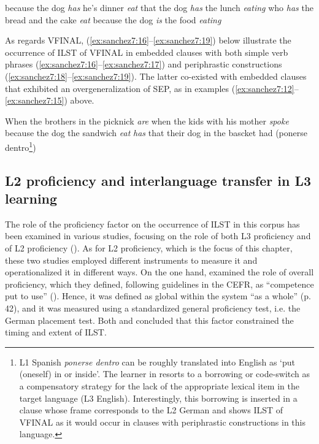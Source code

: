 \documentclass[output=paper,modfonts,nonflat, newtxmath]{langsci/langscibook}
\begin{document}
\ea%
  \label{ex:sanchez7:12}
  because the dog  \textit{has} he’s dinner {\textit{eat}}
\ex %
  \label{ex:sanchez7:13}
  that the dog \textit{has} the lunch {\textit{eating}}
\ex%
  \label{ex:sanchez7:14}
  who  \textit{has} the bread and the cake { \textit{eat}}
\ex%
  \label{ex:sanchez7:15}
  because the dog  \textit{is} the food { \textit{eating}}
\z

As regards VFINAL, (\ref{ex:sanchez7:16}--\ref{ex:sanchez7:19}) below illustrate the occurrence of ILST of VFINAL in embedded clauses with both simple verb phrases (\ref{ex:sanchez7:16}--\ref{ex:sanchez7:17}) and periphrastic constructions (\ref{ex:sanchez7:18}--\ref{ex:sanchez7:19}). The latter co-existed with embedded clauses that exhibited an overgeneralization of SEP, as in examples (\ref{ex:sanchez7:12}--\ref{ex:sanchez7:15}) above.

\ea%
  \label{ex:sanchez7:16}
  When the brothers in the picknick {\textit{are}}
\ex %
  \label{ex:sanchez7:17}
  when the kids with his mother {\textit{spoke}}
\ex %
  \label{ex:sanchez7:18}
  	because the dog the sandwich {\textit{eat}} {\textit{has}}
\ex %
  \label{ex:sanchez7:19}
  that their dog in the bascket {{had}} ({{ponerse} {dentro}}\footnote{L1 Spanish \textit{ponerse dentro} can be roughly translated into English as `put (oneself) in or inside'. The learner in  resorts to a borrowing or code-switch as a compensatory strategy for the lack of the appropriate lexical item in the target language (L3 English). Interestingly, this borrowing is inserted in a clause whose frame corresponds to the L2 German and shows ILST of VFINAL as it would occur in clauses with periphrastic constructions in this language.})
\z


\subsection{{L2} {proficiency} {and} {interlanguage} {transfer} {in} {L3} {learning}}%


The role of the proficiency factor on the occurrence of ILST in this corpus has been examined in various studies, focusing on the role of both L3 proficiency \citep{Sánchez2014} and of L2 proficiency (\citealt{Sánchez2011, SánchezBardel2017}). As for L2 proficiency, which is the focus of this chapter, these two studies employed different instruments to measure it and operationalized it in different ways. On the one hand, \citet{SánchezBardel2017} examined the role of {overall} proficiency, which they defined, following guidelines in the CEFR, as “competence put to use” (\citealt[187]{CouncilofEurope2001}). Hence, it was defined as global within the system “as a whole” (p. 42), and it was measured using a standardized general proficiency test, i.e. the German placement test. Both \citet{Sánchez2011} and \citet{SánchezBardel2017} concluded that this factor constrained the timing and extent of ILST.
\end{document}

